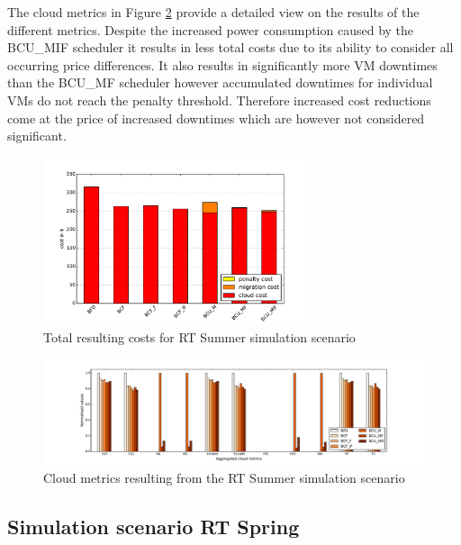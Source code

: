 The cloud metrics in Figure \ref{fig:RT_Summer_cloud_metrics} provide a detailed view on the results of the different metrics. Despite the increased power consumption caused by the BCU\_MIF scheduler it results in less total costs due to its ability to consider all occurring price differences. 
It also results in significantly more VM downtimes than the BCU\_MF scheduler however accumulated downtimes for individual VMs do not reach the penalty threshold. Therefore increased cost reductions come at the price of increased downtimes which are however not considered significant. 

\begin{figure}[htbp]
	\centering
		\includegraphics[width=0.7\textwidth]{figures/evaluation_and_results/RT_Summer_total_cost.pdf}
	\caption{Total resulting costs for RT Summer simulation scenario}
	\label{fig:RT_Summer_total_cost}
\end{figure}

\begin{figure}[htbp]
	\centering
	\hspace*{-1.6in}
		\includegraphics[width=1.50\textwidth]{figures/evaluation_and_results/RT_Summer_cloud_metrics.pdf}
	\caption{Cloud metrics resulting from the RT Summer simulation scenario}
	\label{fig:RT_Summer_cloud_metrics}
\end{figure}



\subsection{Simulation scenario RT Spring} \label{ssec:simulation_scenario_rt_spring}

